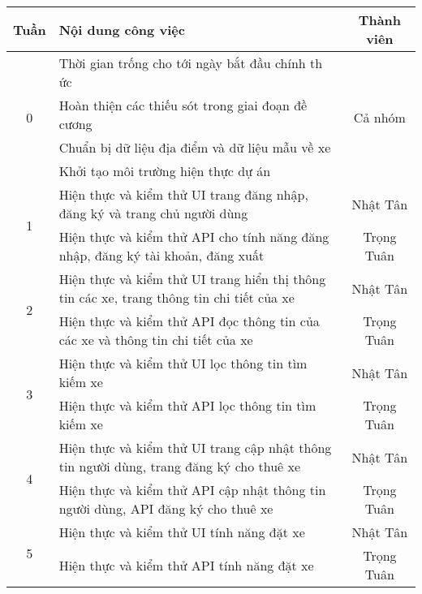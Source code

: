 \documentclass[../main.tex]{subfiles}
\begin{document}
	\begin{table}[ht]
		\centering
		\begin{tabular}{| c | p{10cm} | c |}
			\hline
			\textbf{Tuần} & \centering \textbf{Nội dung công việc}                                          
			& \textbf{Thành viên} 
			\\
			\hline

			\multirow{4}{*}{0} & Thời gian trống cho tới ngày bắt đầu chính th ức 
			& \multirow{4}{*}{Cả nhóm} 
			\\
			\cline{2-2}
			& Hoàn thiện các thiếu sót trong giai đoạn đề cương                               
			&                     
			\\
			\cline{2-2}
			& Chuẩn bị dữ liệu địa điểm và dữ liệu mẫu về xe                                  
			&                     
			\\
			\cline{2-2}
			& Khởi tạo môi trường hiện thực dự án                                             
			&                     
			\\
			\hline

			\multirow{2}{*}{1} & Hiện thực và kiểm thử UI trang đăng nhập, đăng ký và trang chủ người dùng
			& Nhật Tân
			\\
			\cline{2-3}
			& Hiện thực và kiểm thử API cho tính năng đăng nhập, đăng ký tài khoản, đăng xuất
			& Trọng Tuân
			\\
			\hline

			\multirow{2}{*}{2} & Hiện thực và kiểm thử UI trang hiển thị thông tin các xe, trang thông tin chi tiết của xe
			& Nhật Tân
			\\
			\cline{2-3}
			& Hiện thực và kiểm thử API đọc thông tin của các xe và thông tin chi tiết của xe
			& Trọng Tuân
			\\
			\hline

			\multirow{2}{*}{3} & Hiện thực và kiểm thử UI lọc thông tin tìm kiếm xe
			& Nhật Tân \\
			\cline{2-3}
			& Hiện thực và kiểm thử API lọc thông tin tìm kiếm xe
			& Trọng Tuân
			\\
			\hline

			\multirow{2}{*}{4} & Hiện thực và kiểm thử UI trang cập nhật thông tin người dùng, trang đăng ký cho thuê xe
			& Nhật Tân
			\\
			\cline{2-3}
			& Hiện thực và kiểm thử API cập nhật thông tin người dùng, API đăng ký cho thuê xe
			& Trọng Tuân
			\\
			\hline

			\multirow{2}{*}{5} & Hiện thực và kiểm thử UI tính năng đặt xe
			& Nhật Tân
			\\
			\cline{2-3}
			& Hiện thực và kiểm thử API tính năng đặt xe
			& Trọng Tuân
			\\
			\hline


\end{tabular}
\end{table}
\end{document}
